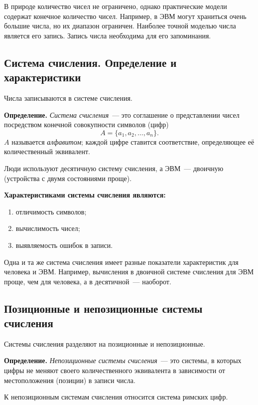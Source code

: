\documentclass[a4paper,11pt]{article}
\newcommand{\lead}[1]{\textbf{\color{leadcol}#1}\ }
\begin{document}
В природе количество чисел не ограничено, однако практические модели содержат конечное
количество чисел. Например, в ЭВМ могут храниться очень большие числа, но их диапазон ограничен.
Наиболее точной моделью числа является его запись. Запись числа необходима для его запоминания.

\subsection{Система счисления. Определение и характеристики}

Числа записываются в системе счисления.

\begin{opr}
\textbf{Определение.} \emph{Система счисления}~--- это соглашение о представлении чисел посредством
конечной совокупности символов (цифр)
\[
  A = \{a_1, a_2, \dots, a_n\}.
\]
$A$ называется \emph{алфавитом}; каждой цифре ставится соответствие, определяющее её
количественный эквивалент.
\end{opr}

Люди используют десятичную систему счисления, а ЭВМ~--- двоичную (устройства с двумя
состояниями проще).

\lead{Характеристиками системы счисления являются:}
\begin{enumerate}[label=\arabic*)]
  \item отличимость символов;
  \item вычислимость чисел;
  \item выявляемость ошибок в записи.
\end{enumerate}

Одна и та же система счисления имеет разные показатели характеристик для человека и ЭВМ.
Например, вычисления в двоичной системе счисления для ЭВМ проще, чем для человека, а в десятичной~---
наоборот.

\subsection{Позиционные и непозиционные системы счисления}

Системы счисления разделяют на позиционные и непозиционные.

\begin{opr}
\textbf{Определение.} \emph{Непозиционные системы счисления}~--- это системы, в которых цифры
не меняют своего количественного эквивалента в зависимости от местоположения (позиции) в записи
числа.
\end{opr}
К непозиционным системам счисления относится система римских цифр.
\end{document}
